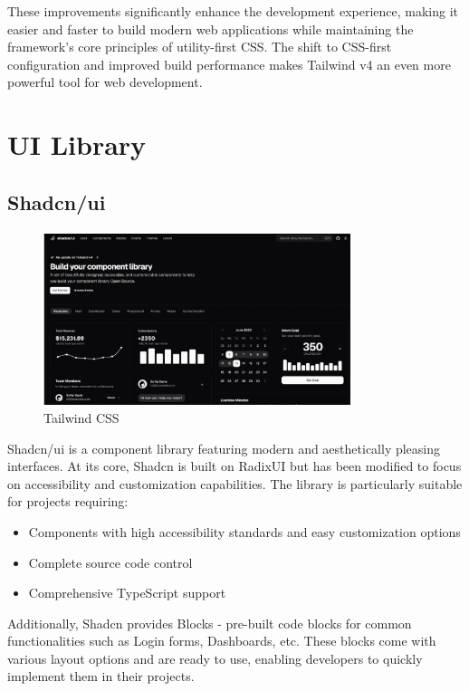 These improvements significantly enhance the development experience, making it easier and faster to build modern web applications while maintaining the framework's core principles of utility-first CSS. The shift to CSS-first configuration and improved build performance makes Tailwind v4 an even more powerful tool for web development.


\section{UI Library}  %
\subsection{Shadcn/ui}
\begin{figure}[H]
    \centering
    \includegraphics[width=0.8\textwidth]{root/shad.png}
    \caption{Tailwind CSS}
\end{figure}
Shadcn/ui \cite{shadcnui} is a component library featuring modern and aesthetically pleasing interfaces. At its core, Shadcn is built on RadixUI but has been modified to focus on accessibility and customization capabilities. The library is particularly suitable for projects requiring:

\begin{itemize}
\item Components with high accessibility standards and easy customization options
\item Complete source code control
\item Comprehensive TypeScript support
\end{itemize}

Additionally, Shadcn provides Blocks - pre-built code blocks for common functionalities such as Login forms, Dashboards, etc. These blocks come with various layout options and are ready to use, enabling developers to quickly implement them in their projects.

